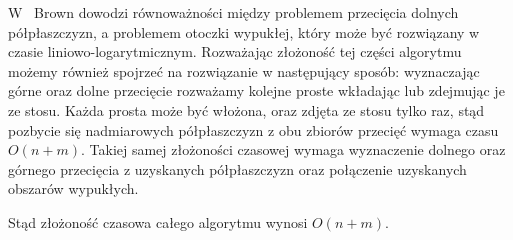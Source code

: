 W~\cite{Brown78} Brown dowodzi równoważności między problemem
przecięcia dolnych półpłaszczyzn, a problemem otoczki wypukłej, który
może być rozwiązany w czasie liniowo-logarytmicznym. Rozważając
złożoność tej części algorytmu możemy również spojrzeć na rozwiązanie
w następujący sposób: wyznaczając górne oraz dolne przecięcie
rozważamy kolejne proste wkładając lub zdejmując je ze stosu. Każda
prosta może być włożona, oraz zdjęta ze stosu tylko raz, stąd pozbycie
się nadmiarowych półpłaszczyzn z obu zbiorów przecięć wymaga czasu
$O(n + m)$. Takiej samej złożoności czasowej wymaga wyznaczenie
dolnego oraz górnego przecięcia z uzyskanych półpłaszczyzn oraz
połączenie uzyskanych obszarów wypukłych.

Stąd złożoność czasowa całego algorytmu wynosi $O(n + m)$.

